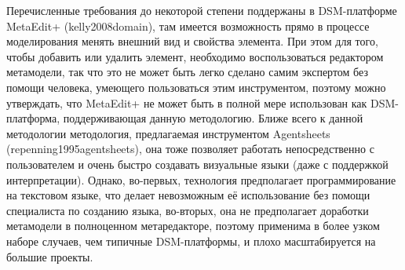	Перечисленные требования до некоторой степени поддержаны в DSM-платформе MetaEdit+ (kelly2008domain), там имеется возможность прямо в процессе моделирования менять внешний вид и свойства элемента. При этом для того, чтобы добавить или удалить элемент, необходимо воспользоваться редактором метамодели, так что это не может быть легко сделано самим экспертом без помощи человека, умеющего пользоваться этим инструментом, поэтому можно утверждать, что MetaEdit+ не может быть в полной мере использован как DSM-платформа, поддерживающая данную методологию. Ближе всего к данной методологии методология, предлагаемая инструментом Agentsheets (repenning1995agentsheets), она тоже позволяет работать непосредственно с пользователем и очень быстро создавать визуальные языки (даже с поддержкой интерпретации). Однако, во-первых, технология предполагает программирование на текстовом языке, что делает невозможным её использование без помощи специалиста по созданию языка, во-вторых, она не предполагает доработки метамодели в полноценном метаредакторе, поэтому применима в более узком наборе случаев, чем типичные DSM-платформы, и плохо масштабируется на большие проекты.

